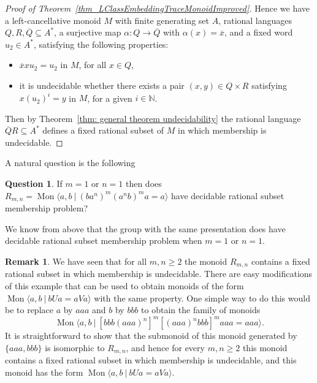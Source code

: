 \documentclass{amsart}
\newcommand{\Mpres}[2]{\operatorname{Mon}\bigl\langle #1\:|\:#2 \bigr\rangle}
\newcommand{\M}{R_{m,n}}
\newcommand{\N}{\mathbb{N}}
\theoremstyle{plain}
\theoremstyle{definition}
\newtheorem{question}[theorem]{Question}
\newtheorem{remark}[theorem]{Remark}
\begin{document}
\begin{proof}[Proof of Theorem~\ref{thm_LClassEmbeddingTraceMonoidImproved}]
Hence we have a left-cancellative monoid $M$ with finite generating set $A$,  
rational languages $Q, R, \overline{Q} \subseteq A^*$,   
a surjective map $\alpha: Q \longrightarrow \overline{Q}$ with $\alpha(x) = \overline{x}$, and a fixed word $u_2 \in A^*$, satisfying the following properties:
\begin{itemize}
\item[(i)] 
$\overline{x} x u_2 = u_2$ in $M$, for all $x \in Q$,
\item[(ii)] 
it is undecidable whether there exists a pair $(x,y) \in Q \times R$ satisfying $x(u_2)^i = y$ in $M$, for a given $i \in \N$.
\end{itemize}
Then by Theorem~\ref{thm: general theorem undecidability} 
the rational language $\overline{Q}R \subseteq A^*$ defines a fixed rational subset of $M$ in which membership is undecidable.
\end{proof}

A natural question is the following 

\begin{question} 
If $m=1$ or $n=1$ then does $\M=\Mpres{a, b}{(b a^n)^m(a^n b)^ma = a}$ have decidable rational subset membership problem?

We know from above that the group with the same presentation does have decidable rational subset membership problem when $m=1$ or $n=1$.   
  \end{question}

\begin{remark}\label{rem_MoreNonSubspecialExamples} 
We have seen that for all $m,n \geq 2$ the monoid 
$\M$
contains a fixed rational subset in which membership is undecidable.  
There are easy modifications of this example that can be used to obtain monoids of the form 
$\Mpres{a,b}{bUa=aVa}$ with the same property. One simple way to do this would be to replace $a$ by $aaa$ and $b$ by $bbb$ to obtain the family of monoids     
\[
\Mpres{a, b}{[bbb (aaa)^n]^m[(aaa)^n bbb]^m aaa = aaa}. 
\]
It is straightforward to show that the submonoid of this monoid generated by $\{aaa,bbb
\}$ is isomorphic to $\M$, and hence for every $m,n \geq 2$ this monoid contains a fixed rational subset in which membership is undecidable, and this monoid has the form  $\Mpres{a,b}{bUa=aVa}$.  
  \end{remark}
\end{document}
